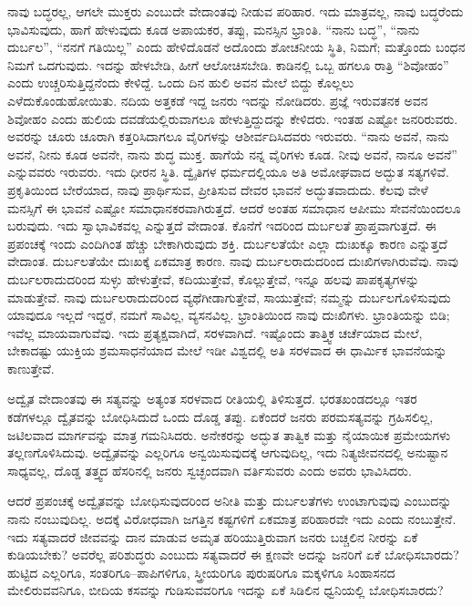 ನಾವು ಬದ್ಧರಲ್ಲ, ಆಗಲೇ ಮುಕ್ತರು ಎಂಬುದೇ ವೇದಾಂತವು ನೀಡುವ ಪರಿಹಾರ. ಇದು ಮಾತ್ರವಲ್ಲ, ನಾವು ಬದ್ಧರೆಂದು ಭಾವಿಸುವುದು, ಹಾಗೆ ಹೇಳುವುದು ಕೂಡ ಅಪಾಯಕರ, ತಪ್ಪು, ಮನಸ್ಸಿನ ಭ್ರಾಂತಿ. “ನಾನು ಬದ್ಧ”, “ನಾನು ದುರ್ಬಲ”, “ನನಗೆ ಗತಿಯಿಲ್ಲ” ಎಂದು ಹೇಳಿದೊಡನೆ ಅದೊಂದು ಶೋಚನೀಯ ಸ್ಥಿತಿ, ನಿಮಗೆ; ಮತ್ತೊಂದು ಬಂಧನ ನಿಮಗೆ ಒದಗುವುದು. ಇದನ್ನು ಹೇಳಬೇಡಿ, ಹೀಗೆ ಆಲೋಚಿಸಬೇಡಿ. ಕಾಡಿನಲ್ಲಿ ಒಬ್ಬ ಹಗಲೂ ರಾತ್ರಿ “ಶಿವೋಹಂ” ಎಂದು ಉಚ್ಚರಿಸುತ್ತಿದ್ದನೆಂದು ಕೇಳಿದ್ದೆ. ಒಂದು ದಿನ ಹುಲಿ ಅವನ ಮೇಲೆ ಬಿದ್ದು ಕೊಲ್ಲಲು ಎಳೆದುಕೊಂಡುಹೋಯಿತು. ನದಿಯ ಅತ್ತಕಡೆ ಇದ್ದ ಜನರು ಇದನ್ನು ನೋಡಿದರು. ಪ್ರಜ್ಞೆ ಇರುವತನಕ ಅವನ ಶಿವೋಹಂ ಎಂದು ಹುಲಿಯ ದವಡೆಯಲ್ಲಿರುವಾಗಲೂ ಹೇಳುತ್ತಿದ್ದುದನ್ನು ಕೇಳಿದರು. ಇಂತಹ ಎಷ್ಟೋ ಜನರಿರುವರು. ಅವರನ್ನು ಚೂರು ಚೂರಾಗಿ ಕತ್ತರಿಸಿದಾಗಲೂ ವೈರಿಗಳನ್ನು ಆಶೀರ್ವದಿಸಿದವರು ಇರುವರು. “ನಾನು ಅವನೆ, ನಾನು ಅವನೆ, ನೀನು ಕೂಡ ಅವನೇ, ನಾನು ಶುದ್ಧ ಮುಕ್ತ. ಹಾಗೆಯೆ ನನ್ನ ವೈರಿಗಳು ಕೂಡ. ನೀವು ಅವನೆ, ನಾನೂ ಅವನೆ” ಎನ್ನುವವರು ಇರುವರು. ಇದು ಧೀರನ ಸ್ಥಿತಿ. ದ್ವೈತಿಗಳ ಧರ್ಮದಲ್ಲಿಯೂ ಅತಿ ಅಮೋಘವಾದ ಅದ್ಭುತ ಸತ್ಯಗಳಿವೆ. ಪ್ರಕೃತಿಯಿಂದ ಬೇರೆಯಾದ, ನಾವು ಪ್ರಾರ್ಥಿಸುವ, ಪ್ರೀತಿಸುವ ದೇವರ ಭಾವನೆ ಅದ್ಭುತವಾದುದು. ಕೆಲವು ವೇಳೆ ಮನಸ್ಸಿಗೆ ಈ ಭಾವನೆ ಎಷ್ಟೋ ಸಮಾಧಾನಕರವಾಗಿರುತ್ತದೆ. ಆದರೆ ಅಂತಹ ಸಮಾಧಾನ ಆಪೀಮು ಸೇವನೆಯಿಂದಲೂ ಬರುವುದು. ಇದು ಸ್ವಾಭಾವಿಕವಲ್ಲ ಎನ್ನುತ್ತದೆ ವೇದಾಂತ. ಕೊನೆಗೆ ಇದರಿಂದ ದುರ್ಬಲತೆ ಪ್ರಾಪ್ತವಾಗುತ್ತದೆ. ಈ ಪ್ರಪಂಚಕ್ಕೆ ಇಂದು ಎಂದಿಗಿಂತ ಹೆಚ್ಚು ಬೇಕಾಗಿರುವುದು ಶಕ್ತಿ. ದುರ್ಬಲತೆಯೇ ಎಲ್ಲಾ ದುಃಖಕ್ಕೂ ಕಾರಣ ಎನ್ನುತ್ತದೆ ವೇದಾಂತ. ದುರ್ಬಲತೆಯೇ ದುಃಖಕ್ಕೆ ಏಕಮಾತ್ರ ಕಾರಣ. ನಾವು ದುರ್ಬಲರಾದುದರಿಂದ ದುಃಖಿಗಳಾಗಿರುವೆವು. ನಾವು ದುರ್ಬಲರಾದುದರಿಂದ ಸುಳ್ಳು ಹೇಳುತ್ತೇವೆ, ಕದಿಯುತ್ತೇವೆ, ಕೊಲ್ಲುತ್ತೇವೆ, ಇನ್ನೂ ಹಲವು ಪಾಪಕೃತ್ಯಗಳನ್ನು ಮಾಡುತ್ತೇವೆ. ನಾವು ದುರ್ಬಲರಾದುದರಿಂದ ವ್ಯಥೆಗೀಡಾಗುತ್ತೇವೆ, ಸಾಯುತ್ತೇವೆ; ನಮ್ಮನ್ನು ದುರ್ಬಲಗೊಳಿಸುವುದು ಯಾವುದೂ ಇಲ್ಲದೆ ಇದ್ದರೆ, ನಮಗೆ ಸಾವಿಲ್ಲ, ವ್ಯಸನವಿಲ್ಲ. ಭ್ರಾಂತಿಯಿಂದ ನಾವು ದುಃಖಿಗಳು. ಭ್ರಾಂತಿಯನ್ನು ಬಿಡಿ; ಇವೆಲ್ಲ ಮಾಯವಾಗುವೆವು. ಇದು ಪ್ರತ್ಯಕ್ಷವಾಗಿದೆ, ಸರಳವಾಗಿದೆ. ಇಷ್ಟೊಂದು ತಾತ್ತ್ವಿಕ ಚರ್ಚೆಯಾದ ಮೇಲೆ, ಬೇಕಾದಷ್ಟು ಯುಕ್ತಿಯ ಶ್ರಮಸಾಧನೆಯಾದ ಮೇಲೆ ಇಡೀ ವಿಶ್ವದಲ್ಲಿ ಅತಿ ಸರಳವಾದ ಈ ಧಾರ್ಮಿಕ ಭಾವನೆಯನ್ನು ಕಾಣುತ್ತೇವೆ.


ಅದ್ವೈತ ವೇದಾಂತವು ಈ ಸತ್ಯವನ್ನು ಅತ್ಯಂತ ಸರಳವಾದ ರೀತಿಯಲ್ಲಿ ತಿಳಿಸುತ್ತದೆ. ಭರತಖಂಡದಲ್ಲೂ ಇತರ ಕಡೆಗಳಲ್ಲೂ ದ್ವೈತವನ್ನು ಬೋಧಿಸಿದುದೆ ಒಂದು ದೊಡ್ಡ ತಪ್ಪು. ಏಕೆಂದರೆ ಜನರು ಪರಮಸತ್ಯವನ್ನು ಗ್ರಹಿಸಲಿಲ್ಲ, ಜಟಿಲವಾದ ಮಾರ್ಗವನ್ನು ಮಾತ್ರ ಗಮನಿಸಿದರು. ಅನೇಕರನ್ನು ಅದ್ಭುತ ತಾತ್ವಿಕ ಮತ್ತು ನೈಯಾಯಿಕ ಪ್ರಮೇಯಗಳು ತಲ್ಲಣಗೊಳಿಸಿದುವು. ಅದ್ವೈತವನ್ನು ಎಲ್ಲರಿಗೂ ಅನ್ವಯಿಸುವುದಕ್ಕೆ ಆಗುವುದಿಲ್ಲ, ಇದು ನಿತ್ಯಜೀವನದಲ್ಲಿ ಅನುಷ್ಟಾನ ಸಾಧ್ಯವಲ್ಲ, ದೊಡ್ಡ ತತ್ತ್ವದ ಹೆಸರಿನಲ್ಲಿ ಜನರು ಸ್ವಚ್ಛಂದವಾಗಿ ವರ್ತಿಸುವರು ಎಂದು ಅವರು ಭಾವಿಸಿದರು.



ಆದರೆ ಪ್ರಪಂಚಕ್ಕೆ ಅದ್ವೈತವನ್ನು ಬೋಧಿಸುವುದರಿಂದ ಅನೀತಿ ಮತ್ತು ದುರ್ಬಲತೆಗಳು ಉಂಟಾಗುವುವು ಎಂಬುದನ್ನು ನಾನು ನಂಬುವುದಿಲ್ಲ. ಅದಕ್ಕೆ ವಿರೋಧವಾಗಿ ಜಗತ್ತಿನ ಕಷ್ಟಗಳಿಗೆ ಏಕಮಾತ್ರ ಪರಿಹಾರವೇ ಇದು ಎಂದು ನಂಬುತ್ತೇನೆ. ಇದು ಸತ್ಯವಾದರೆ ಜೀವವನ್ನು ದಾನ ಮಾಡುವ ಅಮೃತ ಹರಿಯುತ್ತಿರುವಾಗ ಜನರು ಬಚ್ಚಲಿನ ನೀರನ್ನು ಏಕೆ ಕುಡಿಯಬೇಕು? ಅವರೆಲ್ಲ ಪರಿಶುದ್ಧರು ಎಂಬುದು ಸತ್ಯವಾದರೆ ಈ ಕ್ಷಣವೇ ಅದನ್ನು ಜನರಿಗೆ ಏಕೆ ಬೋಧಿಸಬಾರದು? ಹುಟ್ಟಿದ ಎಲ್ಲರಿಗೂ, ಸಂತರಿಗೂ–ಪಾಪಿಗಳಿಗೂ, ಸ್ತ್ರೀಯರಿಗೂ ಪುರುಷರಿಗೂ ಮಕ್ಕಳಿಗೂ ಸಿಂಹಾಸನದ ಮೇಲಿರುವವನಿಗೂ, ಬೀದಿಯ ಕಸವನ್ನು ಗುಡಿಸುವವರಿಗೂ ಇದನ್ನು ಏಕೆ ಸಿಡಿಲಿನ ಧ್ವನಿಯಲ್ಲಿ ಬೋಧಿಸಬಾರದು?

